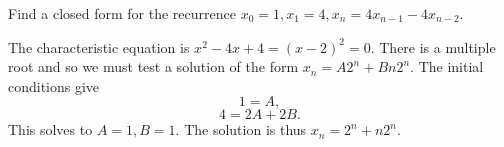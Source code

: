 
\begin{exer}
Find a closed form for the recurrence $x_0 = 1, x_1 = 4, x_n = 4x_{n - 1}  - 4x_{n -
2}.$
\vspace*{4in}
\begin{answer} 
The characteristic equation is $x^2 - 4x + 4 = (x - 2)^2
= 0$. There is a multiple root and so we must test a solution of
the form $x_n = A2^n + Bn2^n.$ The initial conditions give
$$1 = A,$$
$$4 = 2A + 2B.$$ 
This solves to $A = 1, B = 1.$ The solution is thus $x_n = 2^n + n2^n$.
\end{answer}
\end{exer}


